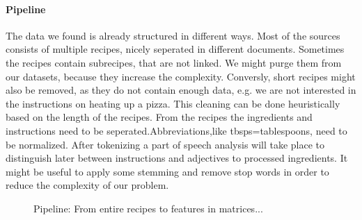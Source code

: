 \documentclass[
     12pt,         %
     a4paper,      %
     BCOR10mm,     %
     DIV14,        %
     ]{article}
\begin{document}
\paragraph{Pipeline} The data we found is already structured in different ways. Most of the sources consists of multiple recipes, nicely seperated in different documents.
Sometimes the recipes contain subrecipes, that are not linked. We might purge them from our datasets, because they increase the complexity. Conversly, short recipes 
might also be removed, as they do not contain enough data, e.g. we are not interested in the instructions on heating up a pizza.
This cleaning can be done heuristically based on the length of the recipes. From the recipes the ingredients and instructions need to be seperated.Abbreviations,like tbsps=tablespoons,
need to be normalized.
After tokenizing a part of speech analysis will take place to distinguish later between instructions and adjectives to processed ingredients.
It might  be useful to apply some stemming and remove stop words in order to reduce the complexity of our problem. 


\begin{figure}[b!]
  \centering

  \caption{Pipeline: From entire recipes to features in matrices...}
  \label{fig:pipeline}
\end{figure}
\end{document}
